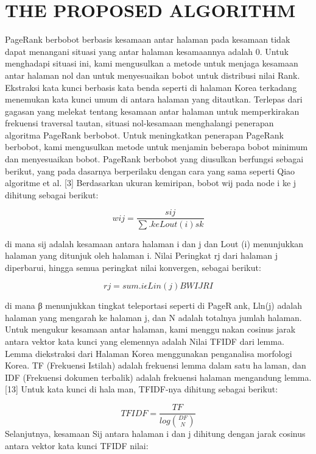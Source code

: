 \documentclass[conference]{IEEEtran}
\begin{document}
\section{THE PROPOSED ALGORITHM}
PageRank berbobot berbasis kesamaan antar halaman
pada kesamaan tidak dapat menangani situasi yang antar
halaman kesamaannya adalah 0. Untuk menghadapi situasi
ini, kami mengusulkan a metode untuk menjaga kesamaan
antar halaman nol dan untuk menyesuaikan bobot untuk
distribusi nilai Rank.
Ekstraksi kata kunci berbasis kata benda seperti di halaman
Korea terkadang menemukan kata kunci umum di antara
halaman yang ditautkan. Terlepas dari gagasan yang melekat
tentang kesamaan antar halaman untuk memperkirakan
frekuensi traversal tautan, situasi nol-kesamaan menghalangi
penerapan algoritma PageRank berbobot.
Untuk meningkatkan penerapan PageRank berbobot,
kami mengusulkan metode untuk menjamin beberapa bobot
minimum dan menyesuaikan bobot. PageRank berbobot yang
diusulkan berfungsi sebagai berikut, yang pada dasarnya
berperilaku dengan cara yang sama seperti Qiao algoritme et
al. [3]
Berdasarkan ukuran kemiripan, bobot wij pada node i ke j
dihitung sebagai berikut:

\begin{equation}
    wij = \frac{sij}{\sum. ke Lout(i) sk  } 
\end{equation}

di mana sij adalah kesamaan antara halaman i dan j dan
Lout (i) menunjukkan halaman yang ditunjuk oleh halaman i.
Nilai Peringkat rj dari halaman j diperbarui, hingga semua
peringkat nilai konvergen, sebagai berikut:

\begin{equation}
    rj = sum. i \epsilon Lin(j) BWIJRI
\end{equation}

di mana β menunjukkan tingkat teleportasi seperti di PageRank, Lln(j) adalah halaman yang mengarah ke halaman j, dan
N adalah totalnya jumlah halaman.
Untuk mengukur kesamaan antar halaman, kami menggunakan cosinus jarak antara vektor kata kunci yang elemennya
adalah Nilai TFIDF dari lemma. Lemma diekstraksi dari
Halaman Korea menggunakan penganalisa morfologi Korea.
TF (Frekuensi Istilah) adalah frekuensi lemma dalam satu halaman, dan IDF (Frekuensi dokumen terbalik) adalah frekuensi
halaman mengandung lemma. [13] Untuk kata kunci di halaman, TFIDF-nya dihitung sebagai berikut:

\begin{equation}
    TFIDF = \frac{TF}{log \binom{DF}{N} } 
\end{equation}
Selanjutnya, kesamaan Sij antara halaman i dan j dihitung
dengan jarak cosinus antara vektor kata kunci TFIDF nilai:
\end{document}
